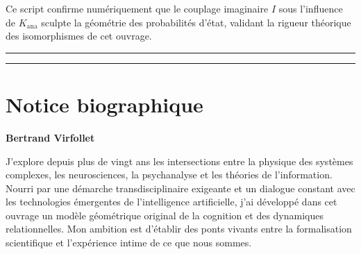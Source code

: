 \documentclass[french, 11pt, twoside, openright, a5paper]{book}
\begin{document}
Ce script confirme numériquement que le couplage imaginaire $I$ sous l'influence de $K_{\text{ana}}$ sculpte la géométrie des probabilités d'état, validant la rigueur théorique des isomorphismes de cet ouvrage.





\begin{center}\rule{0.5\linewidth}{0.5pt}\end{center}

\cleardoublepage



\begin{center}\rule{0.5\linewidth}{0.5pt}\end{center}

\cleardoublepage
\chapter*{Notice biographique}

\begin{center}
{\Large\bfseries Bertrand Virfollet}
\end{center}

\vspace{1.5em}

J'explore depuis plus de vingt ans les intersections entre la physique des systèmes complexes, les neurosciences, la psychanalyse et les théories de l'information. Nourri par une démarche transdisciplinaire exigeante et un dialogue constant avec les technologies émergentes de l'intelligence artificielle, j'ai développé dans cet ouvrage un modèle géométrique original de la cognition et des dynamiques relationnelles. Mon ambition est d'établir des ponts vivants entre la formalisation scientifique et l'expérience intime de ce que nous sommes.
\end{document}
